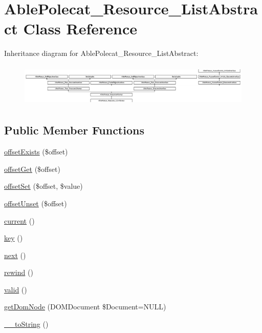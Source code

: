\hypertarget{class_able_polecat___resource___list_abstract}{}\section{Able\+Polecat\+\_\+\+Resource\+\_\+\+List\+Abstract Class Reference}
\label{class_able_polecat___resource___list_abstract}
Inheritance diagram for Able\+Polecat\+\_\+\+Resource\+\_\+\+List\+Abstract\+:\begin{figure}[H]
\begin{center}
\leavevmode
\includegraphics[height=2.048780cm]{class_able_polecat___resource___list_abstract}
\end{center}
\end{figure}
\subsection*{Public Member Functions}
\begin{DoxyCompactItemize}
\item 
\hyperlink{class_able_polecat___resource___list_abstract_a24ff257ec0c2221bc6fd7b1b4388e26e}{offset\+Exists} (\$offset)
\item 
\hyperlink{class_able_polecat___resource___list_abstract_a59aee6e89465b48f014699f41b521f87}{offset\+Get} (\$offset)
\item 
\hyperlink{class_able_polecat___resource___list_abstract_ac6bde6b1eb50eb5377e91771fe46b7a3}{offset\+Set} (\$offset, \$value)
\item 
\hyperlink{class_able_polecat___resource___list_abstract_a2411227ea7118b13495de9839fd4b563}{offset\+Unset} (\$offset)
\item 
\hyperlink{class_able_polecat___resource___list_abstract_af343507d1926e6ecf964625d41db528c}{current} ()
\item 
\hyperlink{class_able_polecat___resource___list_abstract_a729e946b4ef600e71740113c6d4332c0}{key} ()
\item 
\hyperlink{class_able_polecat___resource___list_abstract_acea62048bfee7b3cd80ed446c86fb78a}{next} ()
\item 
\hyperlink{class_able_polecat___resource___list_abstract_ae619dcf2218c21549cb65d875bbc6c9c}{rewind} ()
\item 
\hyperlink{class_able_polecat___resource___list_abstract_abb9f0d6adf1eb9b3b55712056861a247}{valid} ()
\item 
\hyperlink{class_able_polecat___resource___list_abstract_a3241c66cb1cbb7b720be191808876012}{get\+Dom\+Node} (D\+O\+M\+Document \$Document=N\+U\+L\+L)
\item 
\hyperlink{class_able_polecat___resource___list_abstract_a7516ca30af0db3cdbf9a7739b48ce91d}{\+\_\+\+\_\+to\+String} ()
\end{DoxyCompactItemize}

